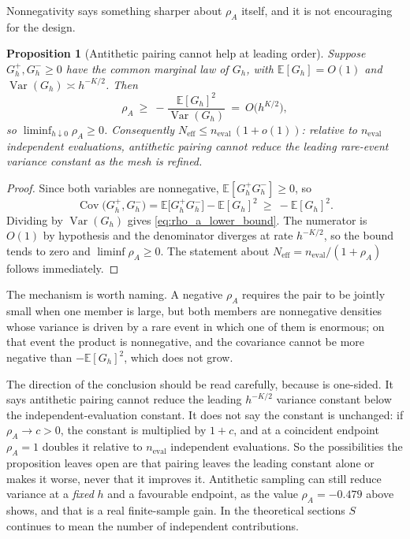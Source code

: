 \documentclass[11pt]{article}
\newtheorem{proposition}[proposition]{Proposition}
\theoremstyle{definition}
\newcommand{\E}{\mathbb{E}}
\newcommand{\Var}{\operatorname{Var}}
\newcommand{\neval}{n_{\mathrm{eval}}}
\newcommand{\Cov}{\operatorname{Cov}}
\begin{document}
Nonnegativity says something sharper about $\rho_A$ itself, and it is not encouraging for the design.

\begin{proposition}[Antithetic pairing cannot help at leading order]\label{prop:antithetic_asymptotic}
Suppose $G_h^{+},G_h^{-}\ge0$ have the common marginal law of $G_h$, with $\E[G_h]=O(1)$ and $\Var(G_h)\asymp h^{-K/2}$. Then
\begin{equation}\label{eq:rho_a_lower_bound}
\rho_A\ \ge\ -\frac{\E[G_h]^2}{\Var(G_h)}\ =\ O\bigl(h^{K/2}\bigr),
\end{equation}
so $\liminf_{h\downarrow0}\rho_A\ge0$. Consequently $N_{\mathrm{eff}}\le \neval\,(1+o(1))$: relative to $\neval$ independent evaluations, antithetic pairing cannot \emph{reduce} the leading rare-event variance constant as the mesh is refined.
\end{proposition}

\begin{proof}
Since both variables are nonnegative, $\E[G_h^{+}G_h^{-}]\ge0$, so
\[
\Cov\bigl(G_h^{+},G_h^{-}\bigr)=\E\bigl[G_h^{+}G_h^{-}\bigr]-\E[G_h]^2\ \ge\ -\E[G_h]^2 .
\]
Dividing by $\Var(G_h)$ gives \eqref{eq:rho_a_lower_bound}. The numerator is $O(1)$ by hypothesis and the denominator diverges at rate $h^{-K/2}$, so the bound tends to zero and $\liminf\rho_A\ge0$. The statement about $N_{\mathrm{eff}}=\neval/(1+\rho_A)$ follows immediately.
\end{proof}

The mechanism is worth naming. A negative $\rho_A$ requires the pair to be jointly small when one member is large, but both members are nonnegative densities whose variance is driven by a rare event in which one of them is enormous; on that event the product is nonnegative, and the covariance cannot be more negative than $-\E[G_h]^2$, which does not grow.

The direction of the conclusion should be read carefully, because  is one-sided. It says antithetic pairing cannot reduce the leading $h^{-K/2}$ variance constant below the independent-evaluation constant. It does not say the constant is unchanged: if $\rho_A\to c>0$, the constant is multiplied by $1+c$, and at a coincident endpoint $\rho_A=1$ doubles it relative to $\neval$ independent evaluations. So the possibilities the proposition leaves open are that pairing leaves the leading constant alone or makes it worse, never that it improves it. Antithetic sampling can still reduce variance at a \emph{fixed} $h$ and a favourable endpoint, as the value $\rho_A=-0.479$ above shows, and that is a real finite-sample gain. In the theoretical sections $S$ continues to mean the number of independent contributions.
\end{document}
